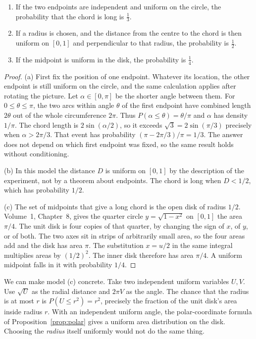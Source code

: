 \begin{theorem}\label{thm:bertrand}
\begin{enumerate}[label=(\alph*)]
\item If the two endpoints are independent and uniform on the circle, the probability that the chord is long is $\frac13$.
\item If a radius is chosen, and the distance from the centre to the chord is then uniform on $[0,1]$ and perpendicular to that radius, the probability is $\frac12$.
\item If the midpoint is uniform in the disk, the probability is $\frac14$.
\end{enumerate}
\end{theorem}
\begin{proof}
(a) First fix the position of one endpoint. Whatever its location, the other endpoint is still uniform on the circle, and the same calculation applies after rotating the picture. Let $\alpha\in[0,\pi]$ be the shorter angle between them. For $0\le\theta\le\pi$, the two arcs within angle $\theta$ of the first endpoint have combined length $2\theta$ out of the whole circumference $2\pi$. Thus $P(\alpha\le\theta)=\theta/\pi$ and $\alpha$ has density $1/\pi$. The chord length is $2\sin(\alpha/2)$, so it exceeds $\sqrt3=2\sin(\pi/3)$ precisely when $\alpha>2\pi/3$. That event has probability $(\pi-2\pi/3)/\pi=1/3$. The answer does not depend on which first endpoint was fixed, so the same result holds without conditioning.

(b) In this model the distance $D$ is uniform on $[0,1]$ by the description of the experiment, not by a theorem about endpoints. The chord is long when $D<1/2$, which has probability $1/2$.

(c) The set of midpoints that give a long chord is the open disk of radius $1/2$. Volume~1, Chapter~8, gives the quarter circle $y=\sqrt{1-x^2}$ on $[0,1]$ the area $\pi/4$. The unit disk is four copies of that quarter, by changing the sign of $x$, of $y$, or of both. The two axes sit in strips of arbitrarily small area, so the four areas add and the disk has area $\pi$. The substitution $x=u/2$ in the same integral multiplies areas by $(1/2)^2$. The inner disk therefore has area $\pi/4$. A uniform midpoint falls in it with probability $1/4$.
\end{proof}

We can make model (c) concrete. Take two independent uniform variables $U,V$. Use $\sqrt U$ as the radial distance and $2\pi V$ as the angle. The chance that the radius is at most $r$ is $P(U\le r^2)=r^2$, precisely the fraction of the unit disk's area inside radius $r$. With an independent uniform angle, the polar-coordinate formula of Proposition~\ref{prop:polar} gives a uniform area distribution on the disk. Choosing the \emph{radius} itself uniformly would not do the same thing.

